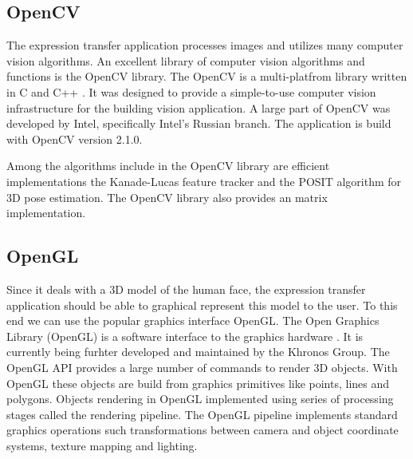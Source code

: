 \documentclass[11pt,a4paper]{report}
\begin{document}
\subsection{OpenCV}
The expression transfer application processes images and utilizes many computer
vision algorithms. An excellent library of computer vision algorithms and
functions is the OpenCV library. The OpenCV is a multi-platfrom library
written in C and C++ \cite{opencv}. It was designed to provide a simple-to-use
computer vision infrastructure for the building vision application. A large part
of OpenCV was developed by Intel, specifically Intel's Russian branch. The application is build with OpenCV version 2.1.0.

Among the algorithms include in the OpenCV library are efficient implementations the Kanade-Lucas feature tracker
and the POSIT algorithm for 3D pose estimation. The OpenCV library also provides
an matrix implementation.

\subsection{OpenGL}
Since it deals with a 3D model of the human face, the expression transfer
application should be able to graphical represent this model to the user. To
this end we can use the popular graphics interface OpenGL. The Open Graphics Library (OpenGL) is a software interface to the graphics
hardware \cite{opengl}. It is currently being furhter developed and maintained
by the Khronos Group. The OpenGL API provides a large
number of commands to render 3D objects. With OpenGL these objects are build
from graphics primitives like points, lines and polygons. Objects rendering in OpenGL
implemented using series of processing stages called the rendering pipeline. The
OpenGL pipeline implements standard graphics operations such transformations
between camera and object coordinate systems, texture mapping and lighting. 
\end{document}
